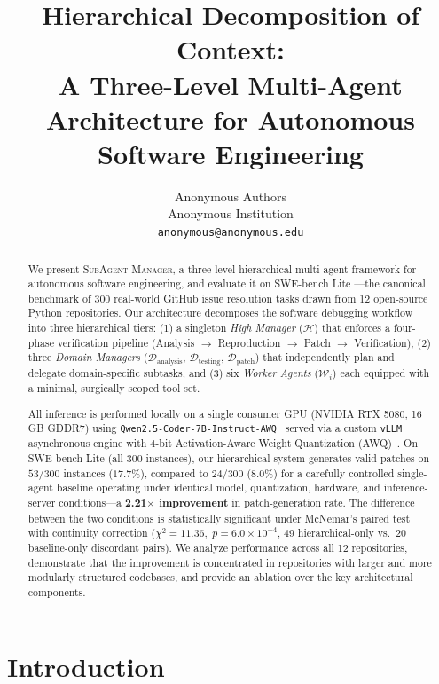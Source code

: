 \documentclass[letterpaper]{aaai25}  %
\title{Hierarchical Decomposition of Context:\\
A Three-Level Multi-Agent Architecture for Autonomous Software Engineering}
\author{
  Anonymous Authors\\
  Anonymous Institution\\
  \texttt{anonymous@anonymous.edu}
}
\newcommand{\sysname}{\textsc{SubAgent Manager}\xspace}
\newcommand{\Hm}{\mathcal{H}}      %
\newcommand{\Dm}{\mathcal{D}}      %
\newcommand{\Wa}{\mathcal{W}}      %
\begin{document}
\maketitle

\begin{abstract}
We present \sysname, a three-level hierarchical multi-agent framework for
autonomous software engineering, and evaluate it on SWE-bench Lite
\cite{jimenez2024swebench}---the canonical benchmark of 300 real-world
GitHub issue resolution tasks drawn from 12 open-source Python repositories.
Our architecture decomposes the software debugging workflow into three
hierarchical tiers: (1) a singleton \emph{High Manager} ($\Hm$) that
enforces a four-phase verification pipeline (Analysis $\to$ Reproduction
$\to$ Patch $\to$ Verification), (2) three \emph{Domain Managers}
($\Dm_{\text{analysis}},\, \Dm_{\text{testing}},\, \Dm_{\text{patch}}$)
that independently plan and delegate domain-specific subtasks, and (3) six
\emph{Worker Agents} ($\Wa_i$) each equipped with a minimal, surgically
scoped tool set.

All inference is performed locally on a single consumer GPU (NVIDIA RTX
5080, 16\,GB GDDR7) using
\texttt{Qwen2.5-Coder-7B-Instruct-AWQ}~\cite{qwen25coder2024} served via a
custom \texttt{vLLM}~\cite{kwon2023vllm} asynchronous engine with 4-bit
Activation-Aware Weight Quantization (AWQ)~\cite{lin2024awq}. On SWE-bench
Lite (all 300 instances), our hierarchical system generates valid patches on
$53/300$ instances ($17.7\%$), compared to $24/300$ ($8.0\%$) for a
carefully controlled single-agent baseline operating under identical model,
quantization, hardware, and inference-server conditions---a \textbf{2.21$\times$
improvement} in patch-generation rate. The difference between the two
conditions is statistically significant under McNemar's paired test with
continuity correction ($\chi^2 = 11.36,\; p = 6.0 \times 10^{-4}$, 49
hierarchical-only vs.\ 20 baseline-only discordant pairs). We analyze
performance across all 12 repositories, demonstrate that the improvement is
concentrated in repositories with larger and more modularly structured
codebases, and provide an ablation over the key architectural components.
\end{abstract}

\section{Introduction}
\label{sec:intro}
\end{document}
